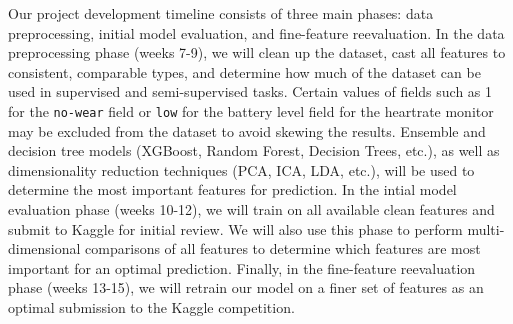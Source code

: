 \documentclass[11pt]{extarticle}
\begin{document}

Our project development timeline consists of three main phases: data preprocessing, initial model evaluation, and fine-feature reevaluation.
In the data preprocessing phase (weeks 7-9), we will clean up the dataset, cast all features to consistent, comparable types, and determine how much of the dataset can be used in supervised and semi-supervised tasks. 
Certain values of fields such as 1 for the \texttt{no-wear} field or \texttt{low} for the battery level field for the heartrate monitor may be excluded from the dataset to avoid skewing the results.
Ensemble and decision tree models (XGBoost, Random Forest, Decision Trees, etc.), as well as dimensionality reduction techniques (PCA, ICA, LDA, etc.), will be used to determine the most important features for prediction.
In the intial model evaluation phase (weeks 10-12), we will train on all available clean features and submit to Kaggle for initial review. 
We will also use this phase to perform multi-dimensional comparisons of all features to determine which features are most important for an optimal prediction.
Finally, in the fine-feature reevaluation phase (weeks 13-15), we will retrain our model on a finer set of features as an optimal submission to the Kaggle competition.



\end{document}
